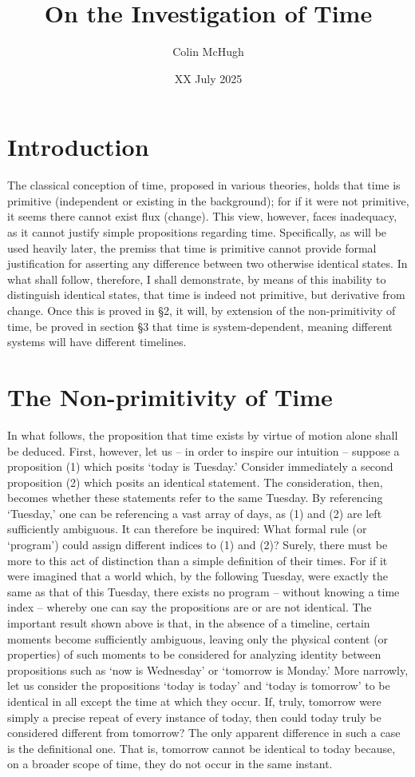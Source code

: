 \documentclass{article}
\title{On the Investigation of Time}
\author{Colin McHugh}
\date{XX July 2025}
\begin{document}
\maketitle

\section{Introduction}
The classical conception of time, proposed in various theories, holds that time is primitive (independent or existing in the background); for if it were not primitive, it seems there cannot exist flux (change). This view, however, faces inadequacy, as it cannot justify simple propositions regarding time. Specifically, as will be used heavily later, the premiss that time is primitive cannot provide formal justification for asserting any difference between two otherwise identical states. In what shall follow, therefore, I shall demonstrate, by means of this inability to distinguish identical states, that time is indeed not primitive, but derivative from change. Once this is proved in §2, it will, by extension of the non-primitivity of time, be proved in section §3 that time is system-dependent, meaning different systems will have different timelines. 

\section{The Non-primitivity of Time}
In what follows, the proposition that time exists by virtue of motion alone shall be deduced. First, however, let us – in order to inspire our intuition – suppose a proposition (1) which posits ‘today is Tuesday.’ Consider immediately a second proposition (2) which posits an identical statement. The consideration, then, becomes whether these statements refer to the same Tuesday. By referencing ‘Tuesday,’ one can be referencing a vast array of days, as (1) and (2) are left sufficiently ambiguous. It can therefore be inquired: What formal rule (or ‘program’) could assign different indices to (1) and (2)?  Surely, there must be more to this act of distinction than a simple definition of their times. For if it were imagined that a world which, by the following Tuesday, were exactly the same as that of this Tuesday, there exists no program – without knowing a time index – whereby one can say the propositions are or are not identical. The important result shown above is that, in the absence of a timeline, certain moments become sufficiently ambiguous, leaving only the physical content (or properties) of such moments to be considered for analyzing identity between propositions such as ‘now is Wednesday’ or ‘tomorrow is Monday.’
More narrowly, let us consider the propositions ‘today is today’ and ‘today is tomorrow’ to be identical in all except the time at which they occur. If, truly, tomorrow were simply a precise repeat of every instance of today, then could today truly be considered different from tomorrow? The only apparent difference in such a case is the definitional one. That is, tomorrow cannot be identical to today because, on a broader scope of time, they do not occur in the same instant. 
\end{document}
